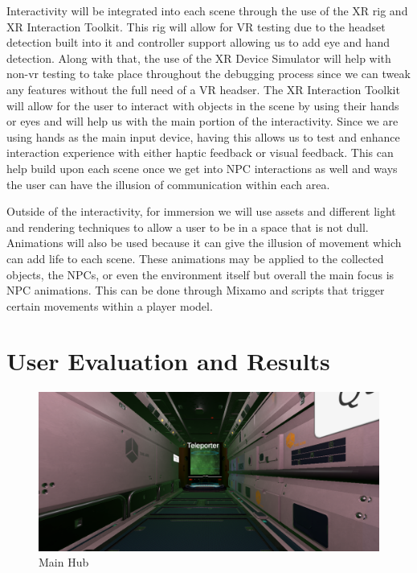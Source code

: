 \documentclass{vgtc}                          %
\begin{document}
Interactivity will be integrated into each scene through the use of the XR rig and XR Interaction Toolkit. This rig will allow for VR testing due to the headset detection built into it and controller support allowing us to add eye and hand detection.
Along with that, the use of the XR Device Simulator will help with non-vr testing to take place throughout the debugging process since we can tweak any features without the full need of a VR headser. The XR Interaction Toolkit will allow for the user to
interact with objects in the scene by using their hands or eyes and will help us with the main portion of the interactivity. Since we are using hands as the main input device, having this allows us to test and enhance interaction experience with either haptic feedback
or visual feedback. This can help build upon each scene once we get into NPC interactions as well and ways the user can have the illusion of communication within each area.

Outside of the interactivity, for immersion we will use assets and different light and rendering techniques to allow a user to be in a space that is not dull. Animations will also be used because it can give the illusion of movement which can add life to each scene.
These animations may be applied to the collected objects, the NPCs, or even the environment itself but overall the main focus is NPC animations. This can be done through Mixamo and scripts that trigger certain movements within a player model.

\section{User Evaluation and Results}
\begin{figure}[ht!]
  \centering
  \includegraphics[width= \linewidth]{Figures/HubLoad.png}
  \caption{Main Hub}
  \label{fig:hubload}
\end{figure}
\end{document}
